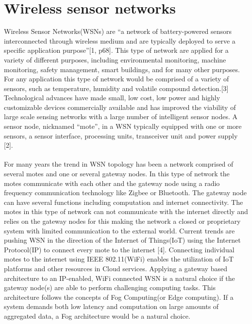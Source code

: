 \documentclass[]{uiophd}
\begin{document}
\section{Wireless sensor networks}
Wireless Sensor Networks(WSNs) are “a network of battery-powered sensors interconnected through wireless medium and are typically deployed to serve a specific application purpose”[1, p68]. This type of network are applied for a variety of different purposes, including environmental monitoring, machine monitoring, safety management, smart buildings, and for many other purposes. For any application this type of network would be comprised of a variety of sensors, such as temperature, humidity and volatile compound detection.[3] Technological advances have made small, low cost, low power and highly customizable devices commercially available and has improved the viability of large scale sensing networks with a large number of intelligent sensor nodes. A sensor node, nicknamed “mote”, in a WSN typically equipped with one or more sensors, a sensor interface, processing units, transceiver unit and power supply [2]. 
\\\\
For many years the trend in WSN topology has been a network comprised of several motes and one or several gateway nodes. In this type of network the motes communicate with each other and the gateway node using a radio frequency communication technology like Zigbee or Bluetooth. The gateway node can have several functions including computation and internet connectivity. The motes in this type of network can not communicate with the internet directly and relies on the gateway nodes for this making the network a closed or proprietary system with limited communication to the external world. Current trends are pushing WSN in the direction of the Internet of Things(IoT) using the Internet Protocol(IP) to connect every mote to the internet [4]. Connecting individual motes to the internet using  IEEE 802.11(WiFi) enables the utilization of IoT platforms and other resources in Cloud services. Applying a gateway based architecture to an IP-enabled, WiFi connected WSN is a natural choice if the gateway node(s) are able to perform challenging computing tasks. This architecture follows the concepts of Fog Computing(or Edge computing). If a system demands both low latency and computation on large amounts of aggregated data, a Fog architecture would be a natural choice. 
\\\\
\end{document}

